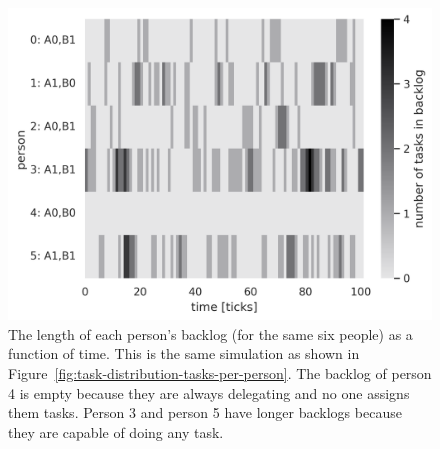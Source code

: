 \begin{figure}[H] %
\centering
\includegraphics[width=1\textwidth]{images/task_distribution_backlog_length_per_person_simCount1_skills2_levels1_taskduration1_people6_social0_ticks100.png}
\caption{The length of each person's backlog (for the same six people) as a function of time. This is the same simulation as shown in Figure~\ref{fig:task-distribution-tasks-per-person}. The backlog of person 4 is empty because they are always delegating and no one assigns them tasks. Person 3 and person 5 have longer backlogs because they are capable of doing any task.}
\label{fig:task-distribution-backlog-length}
\end{figure}





